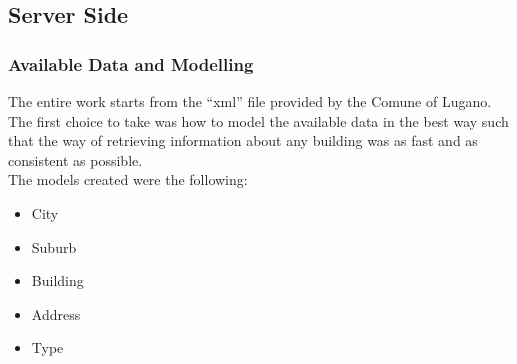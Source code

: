 \subsection{Server Side}
\subsubsection{Available Data and Modelling}
The entire work starts from the ``xml'' file provided by the Comune of Lugano. The first choice to take was how to model the available data in the best way such that the way of retrieving information about any building was as fast and as consistent as possible.\\
The models created were the following:
\begin{itemize}
	\item City
	\item Suburb
	\item Building
	\item Address
	\item Type
\end{itemize}
